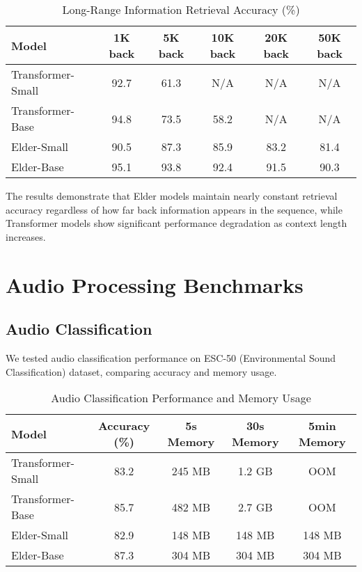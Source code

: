 \begin{table}[h]
\centering
\caption{Long-Range Information Retrieval Accuracy (\%)}
\label{tab:info_retrieval}
\begin{tabular}{|l|c|c|c|c|c|}
\hline
\textbf{Model} & \textbf{1K back} & \textbf{5K back} & \textbf{10K back} & \textbf{20K back} & \textbf{50K back} \\
\hline
Transformer-Small & 92.7 & 61.3 & N/A & N/A & N/A \\
Transformer-Base & 94.8 & 73.5 & 58.2 & N/A & N/A \\
Elder-Small & 90.5 & 87.3 & 85.9 & 83.2 & 81.4 \\
Elder-Base & 95.1 & 93.8 & 92.4 & 91.5 & 90.3 \\
\hline
\end{tabular}
\end{table}

The results demonstrate that Elder models maintain nearly constant retrieval accuracy regardless of how far back information appears in the sequence, while Transformer models show significant performance degradation as context length increases.

\section{Audio Processing Benchmarks}

\subsection{Audio Classification}

We tested audio classification performance on ESC-50 (Environmental Sound Classification) dataset, comparing accuracy and memory usage.

\begin{table}[ht]
\centering
\caption{Audio Classification Performance and Memory Usage}
\label{tab:audio_classification}
\begin{tabular}{|l|c|c|c|c|}
\hline
\textbf{Model} & \textbf{Accuracy (\%)} & \textbf{5s Memory} & \textbf{30s Memory} & \textbf{5min Memory} \\
\hline
Transformer-Small & 83.2 & 245 MB & 1.2 GB & OOM \\
Transformer-Base & 85.7 & 482 MB & 2.7 GB & OOM \\
Elder-Small & 82.9 & 148 MB & 148 MB & 148 MB \\
Elder-Base & 87.3 & 304 MB & 304 MB & 304 MB \\
\hline
\end{tabular}
\end{table}

